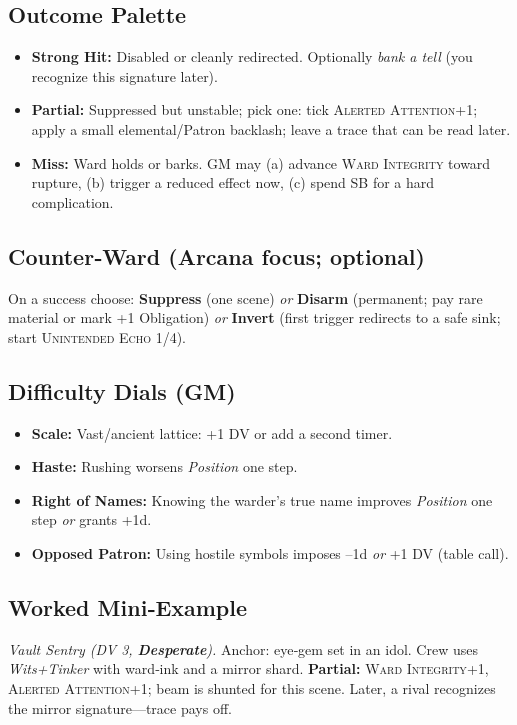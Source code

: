 \subsection*{Outcome Palette}
\begin{itemize}
    \item \textbf{Strong Hit:} Disabled or cleanly redirected. Optionally \emph{bank a tell} (you recognize this signature later).
    \item \textbf{Partial:} Suppressed but unstable; pick one: tick \textsc{Alerted Attention}+1; apply a small elemental/Patron backlash; leave a trace that can be read later.
    \item \textbf{Miss:} Ward holds or barks. GM may (a) advance \textsc{Ward Integrity} toward rupture, (b) trigger a reduced effect now, (c) spend SB for a hard complication.
\end{itemize}

\subsection*{Counter‑Ward (Arcana focus; optional)}
On a success choose: \textbf{Suppress} (one scene) \emph{or} \textbf{Disarm} (permanent; pay rare material or mark +1 Obligation) \emph{or} \textbf{Invert} (first trigger redirects to a safe sink; start \textsc{Unintended Echo} 1/4).

\subsection*{Difficulty Dials (GM)}
\begin{itemize}
    \item \textbf{Scale:} Vast/ancient lattice: +1 DV or add a second timer.
    \item \textbf{Haste:} Rushing worsens \emph{Position} one step.
    \item \textbf{Right of Names:} Knowing the warder's true name improves \emph{Position} one step \emph{or} grants +1d.
    \item \textbf{Opposed Patron:} Using hostile symbols imposes --1d \emph{or} +1 DV (table call).
\end{itemize}

\subsection*{Worked Mini‑Example}
\emph{Vault Sentry (DV 3, \textbf{Desperate}).} Anchor: eye‑gem set in an idol. Crew uses \emph{Wits+Tinker} with ward‑ink and a mirror shard. \textbf{Partial:} \textsc{Ward Integrity}+1, \textsc{Alerted Attention}+1; beam is shunted for this scene. Later, a rival recognizes the mirror signature---trace pays off.

